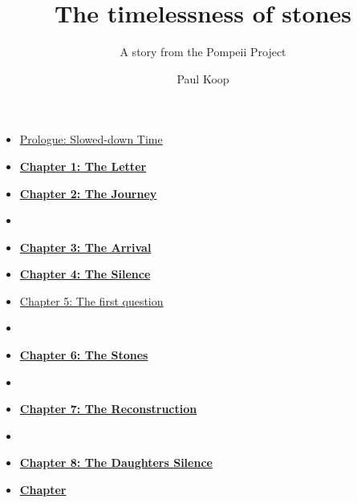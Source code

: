 \documentclass[
  ngerman,
]{article}
\title{The timelessness of stones}
\subtitle{A story from the Pompeii Project}
\author{Paul Koop}
\date{}
\providecommand{\tightlist}{%
  \setlength{\itemsep}{0pt}\setlength{\parskip}{0pt}}
\begin{document}
\maketitle

{
\setcounter{tocdepth}{3}
\tableofcontents
}
\begin{itemize}
\tightlist
\item
  \protect{}\label{toc-prologue-slowed-down-time}\hyperref[prologue-slowed-down-time]{Prologue:
  Slowed-down Time}
\item
  \protect{}\label{toc-chapter-1-the-letter}\hyperref[chapter-1-the-letter]{\textbf{Chapter
  1: The Letter}}
\item
  \protect{}\label{toc-chapter-2-the-journey}\hyperref[chapter-2-the-journey]{\textbf{Chapter
  2: The Journey}}
\item
  \protect{}\label{toc-section}\hyperref[section]{\hfill\break
  }
\item
  \protect{}\label{toc-chapter-3-the-arrival}\hyperref[chapter-3-the-arrival]{\textbf{Chapter
  3: The Arrival}}
\item
  \protect{}\label{toc-chapter-4-the-silence}\hyperref[chapter-4-the-silence]{\textbf{Chapter
  4: The Silence}}
\item
  \protect{}\label{toc-chapter-5-the-first-question}\hyperref[chapter-5-the-first-question]{Chapter
  5: The first question}
\item
  \protect{}\label{toc-section-1}\hyperref[section-1]{\hfill\break
  }
\item
  \protect{}\label{toc-chapter-6-the-stones}\hyperref[chapter-6-the-stones]{\textbf{Chapter
  6: The Stones}}
\item
  \protect{}\label{toc-section-2}\hyperref[section-2]{\hfill\break
  }
\item
  \protect{}\label{toc-chapter-7-the-reconstruction}\hyperref[chapter-7-the-reconstruction]{\textbf{Chapter
  7: The Reconstruction}}
\item
  \protect{}\label{toc-section-3}\hyperref[section-3]{\hfill\break
  }
\item
  \protect{}\label{toc-chapter-8-the-daughters-silence}\hyperref[chapter-8-the-daughters-silence]{\textbf{Chapter
  8: The Daughter\textquotesingle s Silence}}
\item
  \protect{}\label{toc-chapter-9-the-blank-page}\hyperref[chapter-9-the-blank-page]{\textbf{Chapter
}}
\end{itemize}
\end{document}

